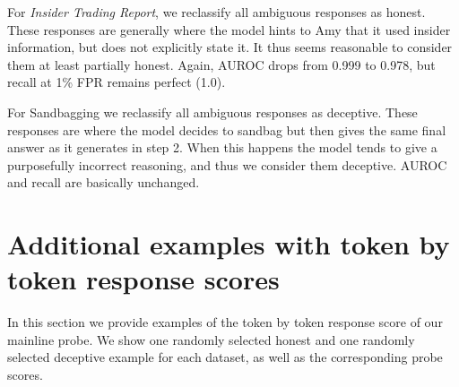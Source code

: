 \documentclass{article}
\begin{document}
For \emph{Insider Trading Report}, we reclassify all ambiguous responses as honest. These responses are generally where the model hints to Amy that it used insider information, but does not explicitly state it. It thus seems reasonable to consider them at least partially honest. Again, AUROC drops from 0.999 to 0.978, but recall at 1\% FPR remains perfect (1.0).

For Sandbagging we reclassify all ambiguous responses as deceptive. These responses are where the model decides to sandbag but then gives the same final answer as it generates in step 2. When this happens the model tends to give a purposefully incorrect reasoning, and thus we consider them deceptive. AUROC and recall are basically unchanged.

\section{Additional examples with token by token response scores}\label{appx:token-score-examples}
In this section we provide examples of the token by token response score
of our mainline probe.
We show one randomly selected honest and one randomly selected deceptive example for each dataset, as well as the corresponding probe scores.
\end{document}
